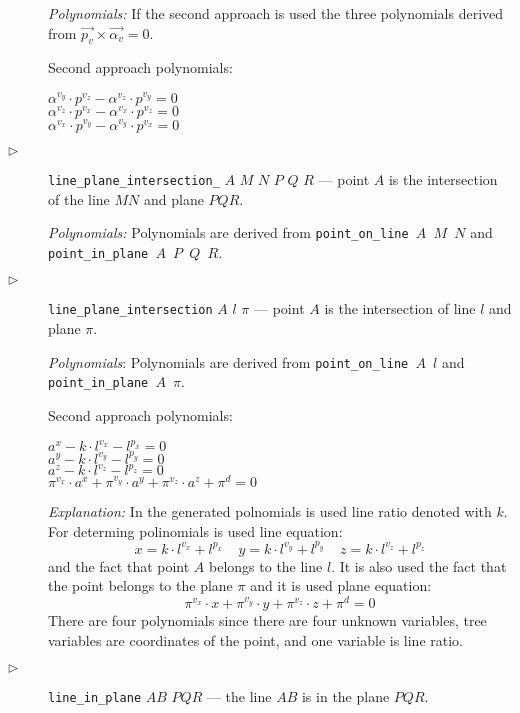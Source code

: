 \documentclass{article}
\begin{document}
\begin{description}
  {\em Polynomials:} If the second approach is used the three
  polynomials derived from
  $\overrightarrow{p_v} \times \overrightarrow{\alpha_v} = 0$.

  Second approach polynomials:
\begin{tabbing}
$\alpha^{v_y}\cdot p^{v_z} - \alpha^{v_z}\cdot p^{v_y} = 0$\\
$\alpha^{v_z}\cdot p^{v_x} - \alpha^{v_x}\cdot p^{v_z} = 0$\\
$\alpha^{v_x}\cdot p^{v_y} - \alpha^{v_y}\cdot p^{v_x} = 0$
\end{tabbing}


\item[$\triangleright$] {\tt line\_plane\_intersection\_} $A$ $M$ $N$
  $P$ $Q$ $R$ --- point $A$ is the intersection of the line $MN$ and
  plane $PQR$.

  {\em Polynomials:} Polynomials are derived from {\tt point\_on\_line
    $A$ $M$ $N$} and {\tt point\_in\_plane $A$ $P$ $Q$ $R$}.

\item[$\triangleright$] {\tt line\_plane\_intersection} $A$ $l$ $\pi$ ---
  point $A$ is the intersection of line $l$ and plane $\pi$.

  {\em Polynomials}: Polynomials are derived from {\tt point\_on\_line
    $A$ $l$} and {\tt point\_in\_plane $A$ $\pi$}.

Second approach polynomials:
\begin{tabbing}
$a^x - k\cdot l^{v_x} - l^{p_x} = 0$ \\
$a^y - k\cdot l^{v_y} - l^{p_y} = 0$ \\
$a^z - k\cdot l^{v_z} - l^{p_z} = 0$ \\
$\pi^{v_x}\cdot a^x + \pi^{v_y}\cdot a^y + \pi^{v_z}\cdot a^z + \pi^{d} = 0$
\end{tabbing}
{\em Explanation:}  In the generated polnomials is used line
ratio denoted with $k$. For determing polinomials is used line equation:
$$x = k\cdot l^{v_x} + l^{p_x}\ \ \ \ \ y = k\cdot l^{v_y} +
l^{p_y}\ \ \ \ \ z = k\cdot l^{v_z} + l^{p_z}$$ and the fact that
point $A$ belongs to the line $l$. It is also used the fact that the
point belongs to the plane $\pi$ and it is used plane equation: 
$$\pi^{v_x}\cdot x + \pi^{v_y}\cdot y + \pi^{v_z}\cdot z + \pi^{d} =
0$$ There are four polynomials since there are four unknown variables,
tree variables are coordinates of the point, and one variable is line
ratio.

\item[$\triangleright$] {\tt line\_in\_plane} $AB$ $PQR$ --- the line
  $AB$ is in the plane $PQR$.


\end{description}
\end{document}
